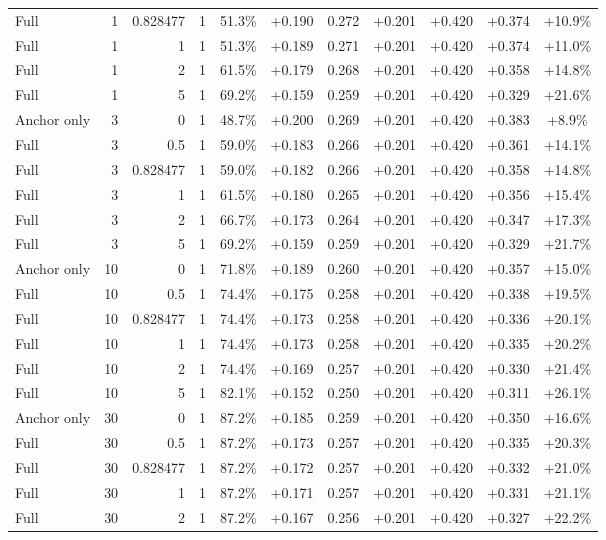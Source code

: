 \begin{table}[htbp]
\begin{tabular}{lrrrccccccc}
Full & 1 & 0.828477 & 1 & 51.3\% & +0.190 & 0.272 & +0.201 & +0.420 & +0.374 & +10.9\% \\
Full & 1 & 1 & 1 & 51.3\% & +0.189 & 0.271 & +0.201 & +0.420 & +0.374 & +11.0\% \\
Full & 1 & 2 & 1 & 61.5\% & +0.179 & 0.268 & +0.201 & +0.420 & +0.358 & +14.8\% \\
Full & 1 & 5 & 1 & 69.2\% & +0.159 & 0.259 & +0.201 & +0.420 & +0.329 & +21.6\% \\
Anchor only & 3 & 0 & 1 & 48.7\% & +0.200 & 0.269 & +0.201 & +0.420 & +0.383 & +8.9\% \\
Full & 3 & 0.5 & 1 & 59.0\% & +0.183 & 0.266 & +0.201 & +0.420 & +0.361 & +14.1\% \\
Full & 3 & 0.828477 & 1 & 59.0\% & +0.182 & 0.266 & +0.201 & +0.420 & +0.358 & +14.8\% \\
Full & 3 & 1 & 1 & 61.5\% & +0.180 & 0.265 & +0.201 & +0.420 & +0.356 & +15.4\% \\
Full & 3 & 2 & 1 & 66.7\% & +0.173 & 0.264 & +0.201 & +0.420 & +0.347 & +17.3\% \\
Full & 3 & 5 & 1 & 69.2\% & +0.159 & 0.259 & +0.201 & +0.420 & +0.329 & +21.7\% \\
Anchor only & 10 & 0 & 1 & 71.8\% & +0.189 & 0.260 & +0.201 & +0.420 & +0.357 & +15.0\% \\
Full & 10 & 0.5 & 1 & 74.4\% & +0.175 & 0.258 & +0.201 & +0.420 & +0.338 & +19.5\% \\
Full & 10 & 0.828477 & 1 & 74.4\% & +0.173 & 0.258 & +0.201 & +0.420 & +0.336 & +20.1\% \\
Full & 10 & 1 & 1 & 74.4\% & +0.173 & 0.258 & +0.201 & +0.420 & +0.335 & +20.2\% \\
Full & 10 & 2 & 1 & 74.4\% & +0.169 & 0.257 & +0.201 & +0.420 & +0.330 & +21.4\% \\
Full & 10 & 5 & 1 & 82.1\% & +0.152 & 0.250 & +0.201 & +0.420 & +0.311 & +26.1\% \\
Anchor only & 30 & 0 & 1 & 87.2\% & +0.185 & 0.259 & +0.201 & +0.420 & +0.350 & +16.6\% \\
Full & 30 & 0.5 & 1 & 87.2\% & +0.173 & 0.257 & +0.201 & +0.420 & +0.335 & +20.3\% \\
Full & 30 & 0.828477 & 1 & 87.2\% & +0.172 & 0.257 & +0.201 & +0.420 & +0.332 & +21.0\% \\
Full & 30 & 1 & 1 & 87.2\% & +0.171 & 0.257 & +0.201 & +0.420 & +0.331 & +21.1\% \\
Full & 30 & 2 & 1 & 87.2\% & +0.167 & 0.256 & +0.201 & +0.420 & +0.327 & +22.2\% \\

\end{tabular}
\end{table}
